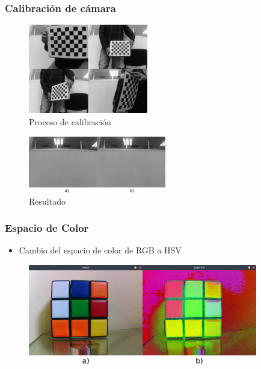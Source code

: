 \documentclass[11pt]{beamer}
\begin{document}
  \begin{frame}
    \frametitle{Calibración de cámara}
    \begin{multicols}{2}
      \begin{figure}[h]
        \includegraphics[width=5.2cm, keepaspectratio]{images/calibracion.eps}
        \caption{Proceso de calibración}
      \end{figure}    
      \begin{figure}[h]
        \includegraphics[width=6cm, keepaspectratio]{images/res-calibracion.png}
        \caption{Resultado}
      \end{figure}    
    \end{multicols}
  \end{frame}
  \begin{frame}
    \frametitle{Espacio de Color}
    \begin{itemize}
      \item Cambio del espacio de color de RGB a HSV
    \end{itemize}
    \begin{figure}[h]
      \includegraphics[width=10cm, keepaspectratio]{images/hsv.png}
    \end{figure}
  \end{frame}
\end{document}
